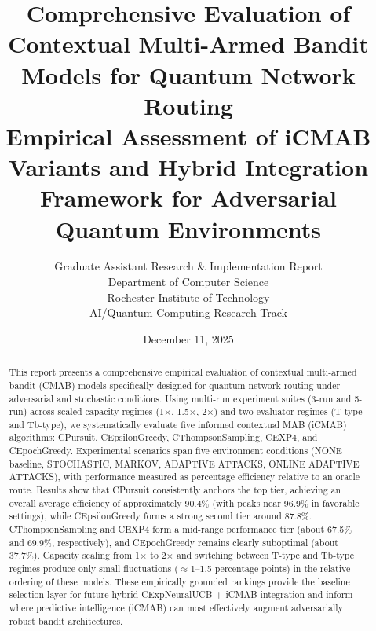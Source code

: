 \documentclass[12pt,a4paper]{article}
\title{\textbf{Comprehensive Evaluation of Contextual Multi-Armed Bandit Models for Quantum Network Routing}\\
\large{Empirical Assessment of iCMAB Variants and Hybrid Integration Framework for Adversarial Quantum Environments}}
\author{Graduate Assistant Research \& Implementation Report\\ 
Department of Computer Science \\ 
Rochester Institute of Technology \\ 
AI/Quantum Computing Research Track}
\date{December 11, 2025}
\begin{document}
\maketitle

\begin{abstract}
This report presents a comprehensive empirical evaluation of contextual multi-armed bandit (CMAB) models specifically designed for quantum network routing under adversarial and stochastic conditions. Using multi-run experiment suites (3-run and 5-run) across scaled capacity regimes (1$\times$, 1.5$\times$, 2$\times$) and two evaluator regimes (T-type and Tb-type), we systematically evaluate five informed contextual MAB (iCMAB) algorithms: CPursuit, CEpsilonGreedy, CThompsonSampling, CEXP4, and CEpochGreedy. Experimental scenarios span five environment conditions (NONE baseline, STOCHASTIC, MARKOV, ADAPTIVE ATTACKS, ONLINE ADAPTIVE ATTACKS), with performance measured as percentage efficiency relative to an oracle route. Results show that CPursuit consistently anchors the top tier, achieving an overall average efficiency of approximately 90.4\% (with peaks near 96.9\% in favorable settings), while CEpsilonGreedy forms a strong second tier around 87.8\%. CThompsonSampling and CEXP4 form a mid-range performance tier (about 67.5\% and 69.9\%, respectively), and CEpochGreedy remains clearly suboptimal (about 37.7\%). Capacity scaling from 1$\times$ to 2$\times$ and switching between T-type and Tb-type regimes produce only small fluctuations ($\approx$1--1.5 percentage points) in the relative ordering of these models. These empirically grounded rankings provide the baseline selection layer for future hybrid CExpNeuralUCB + iCMAB integration and inform where predictive intelligence (iCMAB) can most effectively augment adversarially robust bandit architectures.
\end{abstract}

\newpage
{\tableofcontents}

\newpage
\end{document}
